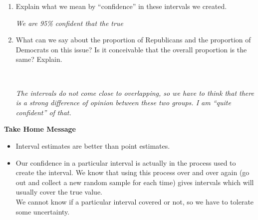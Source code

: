\begin{enumerate}
\begin{enumerate}
\begin{enumerate}
\begin{key}
  {\em (0.701, 0.758), again very close. }
\end{key}
      \end{enumerate}
    \item Explain what we mean by ``confidence'' in these intervals we
      created.
\begin{students}
\vspace{3.8cm}
\end{students}

\begin{key}
  {\em We are 95\% confident that the true }
\end{key}

\item What can we say about the proportion of Republicans and the
  proportion of Democrats on this issue? Is it conceivable that the
  overall proportion is the same?  Explain.
\begin{students}
\\ \vspace{1cm}
\end{students}
\begin{key}
  {\em The intervals do not come close to overlapping, so we have to
    think that there is a strong difference of opinion between these
    two groups. I am ``quite confident'' of that.}
\end{key}
    \end{enumerate}
  \end{enumerate}

\begin{center}
  {\large \bf Take Home Message \vspace{-.2in}} 
\end{center}

\begin{itemize}
\item Interval estimates are better than point estimates.
\item Our confidence in a particular interval is actually in the
  process used to create the interval.  We know that using this
  process over and over again (go out and collect a new random sample
  for each time) gives intervals which will usually
  cover the true value.\\
   We cannot know if a particular interval covered or not, so we have
   to  tolerate some uncertainty.
\end{itemize}





